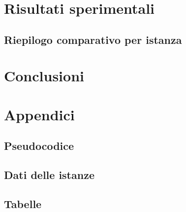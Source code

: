 \documentclass[12pt,a4paper,oneside]{report}
\begin{document}
\chapter{Risultati sperimentali}
\label{ch:risultati}

\section{Riepilogo comparativo per istanza}
\label{sec:riepilogo-istanze}

\chapter{Conclusioni}
\label{ch:conclusioni}

\appendix
\chapter{Appendici}
\label{ch:appendici}

\section{Pseudocodice}
\label{sec:pseudocodice}

\section{Dati delle istanze}
\label{sec:dati-istanze}

\section{Tabelle}
\label{sec:tabelle}
\end{document}
